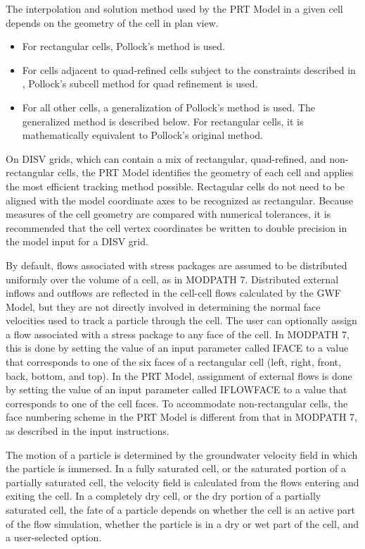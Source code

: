 The interpolation and solution method used by the PRT Model in a given cell depends on the geometry of the cell in plan view.

\begin{itemize}
\item For rectangular cells, Pollock's method \citep{pollock2016modpath7} is used.
\item For cells adjacent to quad-refined cells subject to the constraints described in \citep{pollock2016modpath7}, Pollock's subcell method for quad refinement \citep{pollock2015} is used.
\item For all other \mf cells, a generalization of Pollock's method is used. The generalized method is described below. For rectangular cells, it is mathematically equivalent to Pollock's original method.
\end{itemize}

\noindent On DISV grids, which can contain a mix of rectangular, quad-refined, and non-rectangular cells, the PRT Model identifies the geometry of each cell and applies the most efficient tracking method possible. Rectagular cells do not need to be aligned with the model coordinate axes to be recognized as rectangular. Because measures of the cell geometry are compared with numerical tolerances, it is recommended that the cell vertex coordinates be written to double precision in the model input for a DISV grid.

By default, flows associated with stress packages are assumed to be distributed uniformly over the volume of a cell, as in MODPATH 7. Distributed external inflows and outflows are reflected in the cell-cell flows calculated by the GWF Model, but they are not directly involved in determining the normal face velocities used to track a particle through the cell. The user can optionally assign a flow associated with a stress package to any face of the cell. In MODPATH 7, this is done by setting the value of an input parameter called IFACE to a value that corresponds to one of the six faces of a rectangular cell (left, right, front, back, bottom, and top). In the PRT Model, assignment of external flows is done by setting the value of an input parameter called IFLOWFACE to a value that corresponds to one of the cell faces. To accommodate non-rectangular cells, the face numbering scheme in the PRT Model is different from that in MODPATH 7, as described in the \mf input instructions.

The motion of a particle is determined by the groundwater velocity field in which the particle is immersed. In a fully saturated cell, or the saturated portion of a partially saturated cell, the velocity field is calculated from the flows entering and exiting the cell. In a completely dry cell, or the dry portion of a partially saturated cell, the fate of a particle depends on whether the cell is an active part of the flow simulation, whether the particle is in a dry or wet part of the cell,  and a user-selected option.

